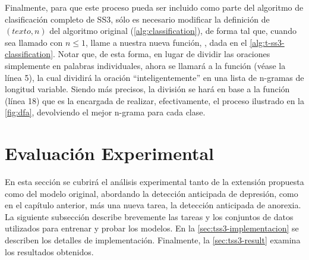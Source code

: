 Finalmente, para que este proceso pueda ser incluido como parte del algoritmo de clasificación completo de SS3, sólo es necesario modificar la definición de $(texto, n)$ del algoritmo original (\autoref{alg:classification}), de forma tal que, cuando sea llamado con $n \leq 1$, llame a nuestra nueva función, , dada en el \autoref{alg:t-ss3-classification}.
Notar que, de esta forma, en lugar de dividir las oraciones simplemente en palabras individuales, ahora se llamará a la función  (véase  la línea 5),
la cual dividirá la oración ``inteligentemente'' en una lista de n-gramas de longitud variable.
Siendo más precisos, la división se hará en base a la función  (línea 18) que es la encargada de realizar, efectivamente, el proceso ilustrado en la \autoref{fig:dfa}, devolviendo el mejor n-grama para cada clase.



\section{Evaluación Experimental}
\label{sec:tss3-results}

En esta sección se cubrirá el análisis experimental tanto de la extensión propuesta como del modelo original, abordando la detección anticipada de depresión, como en el capítulo anterior, más una nueva tarea, la detección anticipada de anorexia.
La siguiente subsección describe brevemente las tareas y los conjuntos de datos utilizados para entrenar y probar los modelos.
En la \autoref{sec:tss3-implementacion} se describen los detalles de implementación.
Finalmente, la \autoref{sec:tss3-result} examina los resultados obtenidos.

